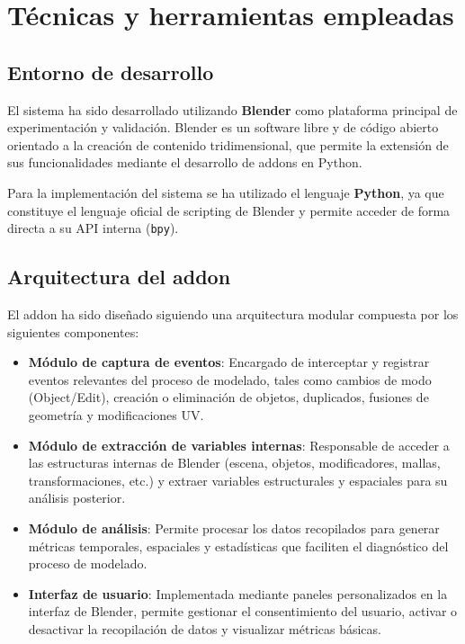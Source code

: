 \chapter{Técnicas y herramientas empleadas}

\section{Entorno de desarrollo}

El sistema ha sido desarrollado utilizando \textbf{Blender} como plataforma principal de experimentación y validación. Blender es un software libre y de código abierto orientado a la creación de contenido tridimensional, que permite la extensión de sus funcionalidades mediante el desarrollo de addons en Python.

Para la implementación del sistema se ha utilizado el lenguaje \textbf{Python}, ya que constituye el lenguaje oficial de scripting de Blender y permite acceder de forma directa a su API interna (\texttt{bpy}).

\section{Arquitectura del addon}

El addon ha sido diseñado siguiendo una arquitectura modular compuesta por los siguientes componentes:

\begin{itemize}
    \item \textbf{Módulo de captura de eventos}: Encargado de interceptar y registrar eventos relevantes del proceso de modelado, tales como cambios de modo (Object/Edit), creación o eliminación de objetos, duplicados, fusiones de geometría y modificaciones UV.
    
    \item \textbf{Módulo de extracción de variables internas}: Responsable de acceder a las estructuras internas de Blender (escena, objetos, modificadores, mallas, transformaciones, etc.) y extraer variables estructurales y espaciales para su análisis posterior.
    
    \item \textbf{Módulo de análisis}: Permite procesar los datos recopilados para generar métricas temporales, espaciales y estadísticas que faciliten el diagnóstico del proceso de modelado.
    
    \item \textbf{Interfaz de usuario}: Implementada mediante paneles personalizados en la interfaz de Blender, permite gestionar el consentimiento del usuario, activar o desactivar la recopilación de datos y visualizar métricas básicas.
\end{itemize}

